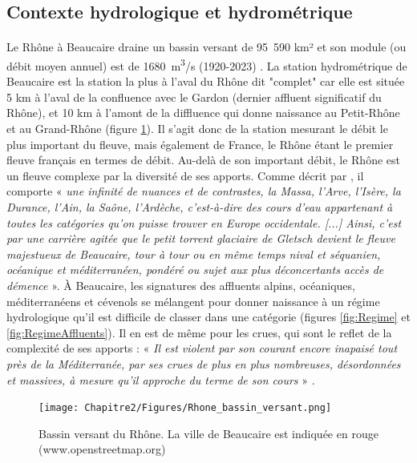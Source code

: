 \FloatBarrier
	\subsection{Contexte hydrologique et hydrométrique}
	
	\paragraph{} Le Rhône à Beaucaire draine un bassin versant de 95~590 km² et son module (ou débit moyen annuel) est de 1680~m\textsuperscript{3}/s (1920-2023) \citep{medd_banque_2021}. La station hydrométrique de Beaucaire est la station la plus à l'aval du Rhône dit "complet" car elle est située 5 km à l'aval de la confluence avec le Gardon (dernier affluent significatif du Rhône), et 10 km à l'amont de la diffluence qui donne naissance au Petit-Rhône et au Grand-Rhône (figure \ref{fig:BV}). Il s'agit donc de la station mesurant le débit le plus important du fleuve, mais également de France, le Rhône étant le premier fleuve français en termes de débit. Au-delà de son important débit, le Rhône est un fleuve complexe par la diversité de ses apports. Comme décrit par \citet{parde_regime_1925}, il comporte « \textit{ une infinité de nuances et de contrastes, la Massa, l'Arve, l'Isère, la Durance, l'Ain, la Saône, l'Ardèche, c'est-à-dire des cours d'eau appartenant à toutes les catégories qu'on puisse trouver en Europe occidentale. [...] Ainsi, c'est par une carrière agitée que le petit torrent glaciaire de Gletsch devient le fleuve majestueux de Beaucaire, tour à tour ou en même temps nival et séquanien, océanique et méditerranéen, pondéré ou sujet aux plus déconcertants accès de démence} ». À Beaucaire, les signatures des affluents alpins, océaniques, méditerranéens et cévenols se mélangent pour donner naissance à un régime hydrologique qu'il est difficile de classer dans une catégorie (figures \ref{fig:Regime} et \ref{fig:RegimeAffluents}). Il en est de même pour les crues, qui sont le reflet de la complexité de ses apports : « \textit{Il est violent par son courant encore inapaisé tout près de la Méditerranée, par ses crues de plus en plus nombreuses, désordonnées et massives, à mesure qu'il approche du terme de son cours} » \citep{parde_regime_1925}. 
	
		\begin{figure}[h!]
	\centering
		\texttt{[image: Chapitre2/Figures/Rhone\_bassin\_versant.png]}
        \caption{Bassin versant du Rhône. La ville de Beaucaire est indiquée en rouge (www.openstreetmap.org)}	
		\label{fig:BV}
	\end{figure}
	
